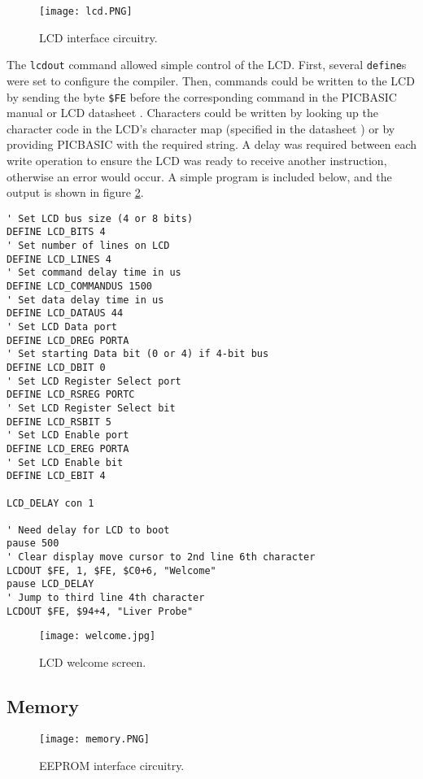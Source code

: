 \begin{figure}[htb]
	\centering
	\texttt{[image: lcd.PNG]}
	\caption{LCD interface circuitry.}
	\label{fig: lcd schematic}
\end{figure}

The \verb|lcdout| command allowed simple control of the LCD. First, several \verb|define|s were set to configure the compiler. Then, commands could be written to the LCD by sending the byte \verb|$FE| before the corresponding command in the PICBASIC manual \cite{picbasic_pro} or LCD datasheet \cite{lcd}. Characters could be written by looking up the character code in the LCD's character map (specified in the datasheet \cite{lcd}) or by providing PICBASIC with the required string. A delay was required between each write operation to ensure the LCD was ready to receive another instruction, otherwise an error would occur. A simple program is included below, and the output is shown in figure \ref{fig: lcd}.

\begin{lstlisting}
' Set LCD bus size (4 or 8 bits)
DEFINE LCD_BITS 4
' Set number of lines on LCD
DEFINE LCD_LINES 4
' Set command delay time in us
DEFINE LCD_COMMANDUS 1500
' Set data delay time in us
DEFINE LCD_DATAUS 44
' Set LCD Data port
DEFINE LCD_DREG PORTA
' Set starting Data bit (0 or 4) if 4-bit bus
DEFINE LCD_DBIT 0
' Set LCD Register Select port
DEFINE LCD_RSREG PORTC
' Set LCD Register Select bit
DEFINE LCD_RSBIT 5
' Set LCD Enable port
DEFINE LCD_EREG PORTA
' Set LCD Enable bit
DEFINE LCD_EBIT 4

LCD_DELAY con 1

' Need delay for LCD to boot
pause 500            
' Clear display move cursor to 2nd line 6th character
LCDOUT $FE, 1, $FE, $C0+6, "Welcome"         
pause LCD_DELAY
' Jump to third line 4th character
LCDOUT $FE, $94+4, "Liver Probe"                
\end{lstlisting}

\begin{figure}[htb]
	\centering
	\texttt{[image: welcome.jpg]}
	\caption{LCD welcome screen.}
	\label{fig: lcd}
\end{figure}





\subsection{Memory}
\begin{figure}[htb]
	\centering
	\texttt{[image: memory.PNG]}
	\caption{EEPROM interface circuitry.}
	\label{fig: memory schematic}
\end{figure}

